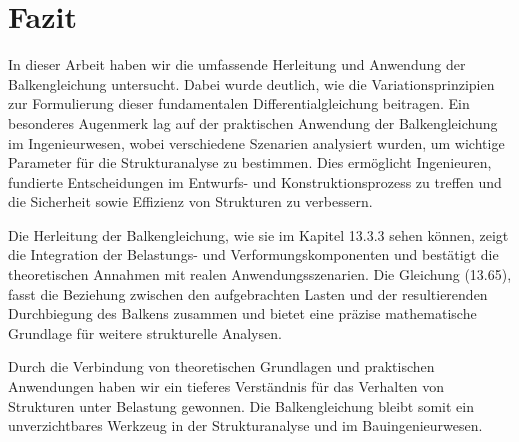%
%
%
%
\section{Fazit\label{balken:section:teil4}}

In dieser Arbeit haben wir die umfassende Herleitung und Anwendung der Balkengleichung untersucht. Dabei wurde deutlich, wie die Variationsprinzipien zur Formulierung dieser fundamentalen Differentialgleichung beitragen. Ein besonderes Augenmerk lag auf der praktischen Anwendung der Balkengleichung im Ingenieurwesen, wobei verschiedene Szenarien analysiert wurden, um wichtige Parameter für die Strukturanalyse zu bestimmen. Dies ermöglicht Ingenieuren, fundierte Entscheidungen im Entwurfs- und Konstruktionsprozess zu treffen und die Sicherheit sowie Effizienz von Strukturen zu verbessern.

Die Herleitung der Balkengleichung, wie sie im Kapitel 13.3.3 sehen können, zeigt die Integration der Belastungs- und Verformungskomponenten und bestätigt die theoretischen Annahmen mit realen Anwendungsszenarien. Die Gleichung (13.65), fasst die Beziehung zwischen den aufgebrachten Lasten und der resultierenden Durchbiegung des Balkens zusammen und bietet eine präzise mathematische Grundlage für weitere strukturelle Analysen.

Durch die Verbindung von theoretischen Grundlagen und praktischen Anwendungen haben wir ein tieferes Verständnis für das Verhalten von Strukturen unter Belastung gewonnen. Die Balkengleichung bleibt somit ein unverzichtbares Werkzeug in der Strukturanalyse und im Bauingenieurwesen.


